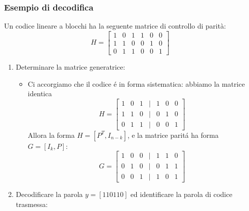         \subsubsection{Esempio di decodifica}
            Un codice lineare a blocchi ha la seguente matrice di controllo di parità:
            \[
                H=
                    \begin{bmatrix}
                    1 & 0 & 1 & 1 & 0 & 0\\
                    1 & 1 & 0 & 0 & 1 & 0\\
                    0 & 1 & 1 & 0 & 0 & 1
                    \end{bmatrix}  
            \]  
            \begin{enumerate}
                \item {Determinare la matrice generatrice:
                    \begin{itemize}
                        \item{ 
                            Ci accorgiamo che il codice é in forma sistematica: abbiamo la matrice identica 
                            \[
                                H=
                                    \begin{bmatrix}
                                    1 & 0 & 1 & | & 1 & 0 & 0\\
                                    1 & 1 & 0 & | & 0 & 1 & 0\\
                                    0 & 1 & 1 & | & 0 & 0 & 1
                                    \end{bmatrix}  
                            \]  
                            Allora la forma $H = [P^T,I_{n-k}]$, e la matrice paritá ha forma $G = [I_k,P]$:
                            \[
                                G=
                                    \begin{bmatrix}
                                    1 & 0 & 0 & | & 1 & 1 & 0 \\
                                    0 & 1 & 0 & | & 0 & 1 & 1 \\
                                    0 & 0 & 1 & | & 1 & 0 & 1 
                                    \end{bmatrix}  
                            \]
                        }
                    \end{itemize}
                }
                \item {Decodificare la parola $y = [110110]$ ed identificare la parola di codice trasmessa:
}
\end{enumerate}
